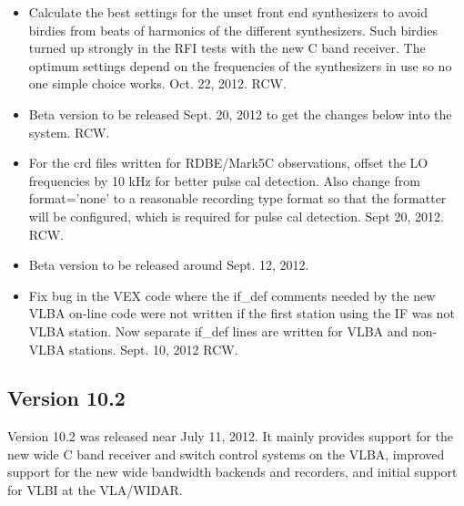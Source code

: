 \documentclass{report}
\begin{document}
\begin{itemize}
\item Calculate the best settings for the unset front end synthesizers
to avoid birdies from beats of harmonics of the different synthesizers.
Such birdies turned up strongly in the RFI tests with the new C band
receiver.  The optimum settings depend on the frequencies of the
synthesizers in use so no one simple choice works.  Oct. 22, 2012.  RCW.

\item Beta version to be released Sept. 20, 2012 to get the changes
below into the system.  RCW.

\item For the crd files written for RDBE/Mark5C observations, offset
the LO frequencies by 10 kHz for better pulse cal detection.  Also
change from format='none' to a reasonable recording type format so
that the formatter will be configured, which is required for pulse
cal detection.  Sept 20, 2012.  RCW.

\item Beta version to be released around Sept. 12, 2012.

\item Fix bug in the VEX code where the if\_def comments needed by the
new VLBA on-line code were not written if the first station using the
IF was not VLBA station.  Now separate if\_def lines are written for
VLBA and non-VLBA stations.  Sept. 10, 2012  RCW.

\end{itemize}

\subsection{\label{SSEC:VER_10.2}Version 10.2}

Version 10.2 was released near July 11, 2012.  It mainly provides
support for the new wide C band receiver and switch control systems on
the VLBA, improved support for the new wide bandwidth backends and
recorders, and initial support for VLBI at the VLA/WIDAR.
\end{document}
